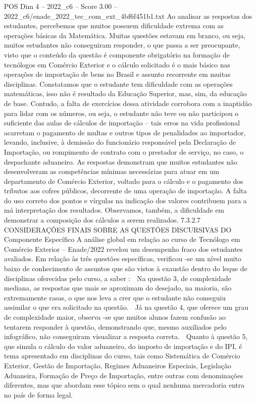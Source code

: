 \begin{textsample}{POS Dim 4 – 2022\_c6 – Score 3.00 – 2022\_c6/enade\_2022\_tec\_com\_ext\_4bf6f451b1.txt}
Ao analisar as respostas dos estudantes, percebemos que muitos possuem dificuldade extrema com as operações básicas da Matemática.
Muitas questões estavam em branco, ou seja, muitos estudantes não conseguiram responder, o que passa a ser preocupante, visto que o conteúdo da questão é componente obrigatório na formação de tecnólogos em Comércio Exterior e o cálculo solicitado é o mais básico nas operações de importação de bens no Brasil e assunto recorrente em muitas disciplinas.
Constatamos que o estudante tem dificuldade com as operações matemáticas, isso não é resultado da Educação Superior, mas, sim, da educação de base.
Contudo, a falta de exercícios dessa atividade corrobora com a inaptidão para lidar com os números, ou seja, o estudante não teve ou não participou o suficiente das aulas de cálculos de importação – tais erros na vida profissional acarretam o pagamento de multas e outros tipos de penalidades ao importador, levando, inclusive, à demissão do funcionário responsável pela Declaração de Importação, ou rompimento de contrato com o prestador de serviço, no caso, o despachante aduaneiro.
As respostas demonstram que muitos estudantes não desenvolveram as competências mínimas necessárias para atuar em um departamento de Comércio Exterior, voltado para o cálculo e o pagamento dos tributos aos cofres públicos, decorrente de uma operação de importação.
A falta do uso correto dos pontos e vírgulas na indicação dos valores contribuem para a má interpretação dos resultados.
Observamos, também, a dificuldade em demonstrar a composição dos cálculos a serem realizados. 7.3.2.7 CONSIDERAÇÕES FINAIS SOBRE AS QUESTÕES DISCURSIVAS DO Componente Específico A análise global em relação ao curso de Tecnólogo em Comércio Exterior – Enade/2022 revelou um desempenho fraco dos estudantes avaliados.
Em relação às três questões específicas, verificou -se um nível muito baixo de conhecimento de assuntos que são vistos à exaustão dentro do leque de disciplinas oferecidas pelo curso, a saber :  Na questão 3, de complexidade mediana, as respostas que mais se aproximam do desejado, na maioria, são extremamente rasas, o que nos leva a crer que o estudante não conseguiu assimilar o que era solicitado na questão.  Já na questão 4, que oferece um grau de complexidade maior, observa -se que muitos alunos fazem confusão ao tentarem responder à questão, demonstrando que, mesmo auxiliados pelo infográfico, não conseguiram visualizar a resposta correta.  Quanto à questão 5, que simula o cálculo do valor aduaneiro, do imposto de importação e do IPI, é tema apresentado em disciplinas do curso, tais como Sistemática de Comércio Exterior, Gestão de Importação, Regimes Aduaneiros Especiais, Legislação Aduaneira, Formação de Preço de Importação, entre outras com denominações diferentes, mas que abordam esse tópico sem o qual nenhuma mercadoria entra no país de forma legal.

\end{textsample}
